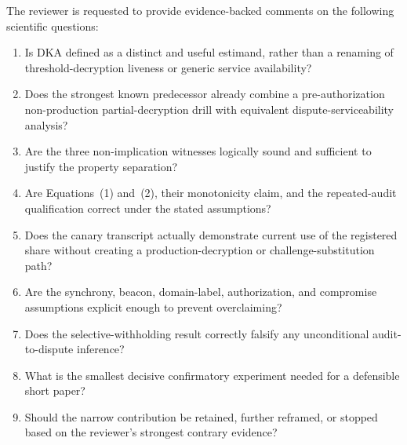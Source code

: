 \documentclass[10pt]{article}
\begin{document}
The reviewer is requested to provide evidence-backed comments on the following scientific questions:

\begin{enumerate}
  \item Is DKA defined as a distinct and useful estimand, rather than a renaming of threshold-decryption liveness or generic service availability?
  \item Does the strongest known predecessor already combine a pre-authorization non-production partial-decryption drill with equivalent dispute-serviceability analysis?
  \item Are the three non-implication witnesses logically sound and sufficient to justify the property separation?
  \item Are Equations~(1) and~(2), their monotonicity claim, and the repeated-audit qualification correct under the stated assumptions?
  \item Does the canary transcript actually demonstrate current use of the registered share without creating a production-decryption or challenge-substitution path?
  \item Are the synchrony, beacon, domain-label, authorization, and compromise assumptions explicit enough to prevent overclaiming?
  \item Does the selective-withholding result correctly falsify any unconditional audit-to-dispute inference?
  \item What is the smallest decisive confirmatory experiment needed for a defensible short paper?
  \item Should the narrow contribution be retained, further reframed, or stopped based on the reviewer’s strongest contrary evidence?
\end{enumerate}



\end{document}
